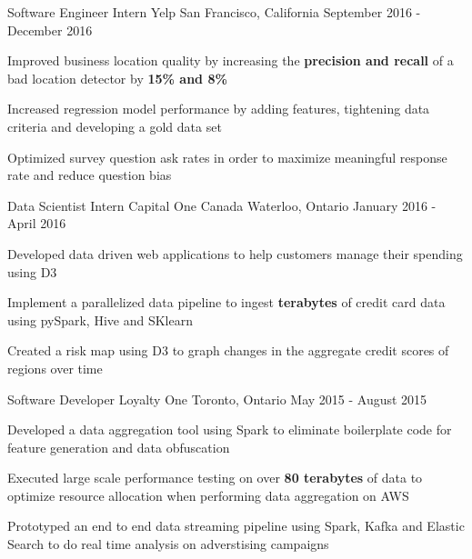 \begin{cventries}
\cventry
{Software Engineer Intern}
{Yelp}
{San Francisco, California}
{September 2016 - December 2016}
{ %
\begin{cvitems}
\item {Improved business location quality by increasing the \textbf{precision and recall} of a bad location detector by \textbf{15\% and 8\%}}
\item {Increased regression model performance by adding features, tightening data criteria and developing a gold data set}
\item {Optimized survey question ask rates in order to maximize meaningful response rate and reduce question bias}
\end{cvitems}
}


\cventry
{Data Scientist Intern}
{Capital One Canada}
{Waterloo, Ontario}
{January 2016 - April 2016}
{ %
\begin{cvitems}
\item {Developed data driven web applications to help customers manage their spending using D3}
\item {Implement a parallelized data pipeline to ingest \textbf{terabytes} of credit card data using pySpark, Hive and SKlearn}
\item {Created a risk map using D3 to graph changes in the aggregate credit scores of regions over time}
\end{cvitems}
}


\cventry
{Software Developer}
{Loyalty One} %
{Toronto, Ontario} %
{May 2015 - August 2015} %
{
\begin{cvitems}
\item {Developed a data aggregation tool using Spark to eliminate boilerplate code for feature generation and data obfuscation}
\item {Executed large scale performance testing on over \textbf{80 terabytes} of data to optimize resource allocation when performing data aggregation on AWS}
\item {Prototyped an end to end data streaming pipeline using Spark, Kafka and Elastic Search to do real time analysis on adverstising campaigns}
\end{cvitems}
}


\end{cventries}
